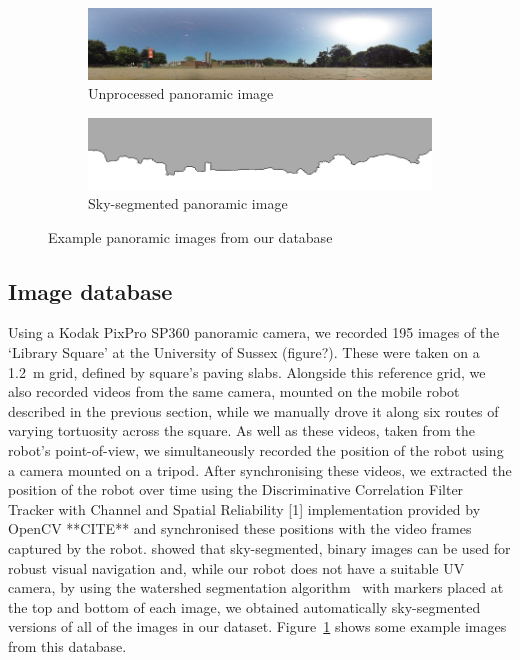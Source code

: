 \documentclass[letterpaper]{article}
\begin{document}
\begin{figure}[t]
    \begin{subfigure}[b]{\columnwidth}
        \includegraphics[width=\columnwidth]{figures/360_240.jpg}
        \caption{Unprocessed panoramic image}
    \end{subfigure}
    \begin{subfigure}[b]{\columnwidth}
        \includegraphics[width=\columnwidth]{figures/360_240_mask.png}
        \caption{Sky-segmented panoramic image}
    \end{subfigure}
    \caption{Example panoramic images from our database}
    \label{fig:database_images}
\end{figure}

\subsection{Image database}
\label{sec:image_database}
Using a Kodak PixPro SP360 panoramic camera, we recorded 195 images of the ‘Library Square’ at the University of Sussex (figure?). 
These were taken on a \SI{1.2}{\metre} grid, defined by square’s paving slabs. 
Alongside this reference grid, we also recorded videos from the same camera, mounted on the mobile robot described in the previous section, while we manually drove it along six routes of varying tortuosity across the square. 
As well as these videos, taken from the robot’s point-of-view, we simultaneously recorded the position of the robot using a camera mounted on a tripod. 
After synchronising these videos, we extracted the position of the robot over time using the Discriminative Correlation Filter Tracker with Channel and Spatial Reliability [1] implementation provided by OpenCV **CITE** and synchronised these positions with the video frames captured by the robot. 
\citet{Stone2014} showed that sky-segmented, binary images can be used for robust visual navigation and, while our robot does not have a suitable UV camera, by using the watershed segmentation algorithm~\citep{Beucher1979} with markers placed at the top and bottom of each image, we obtained automatically sky-segmented versions of all of the images in our dataset.
Figure~\ref{fig:database_images} shows some example images from this database.
\end{document}
